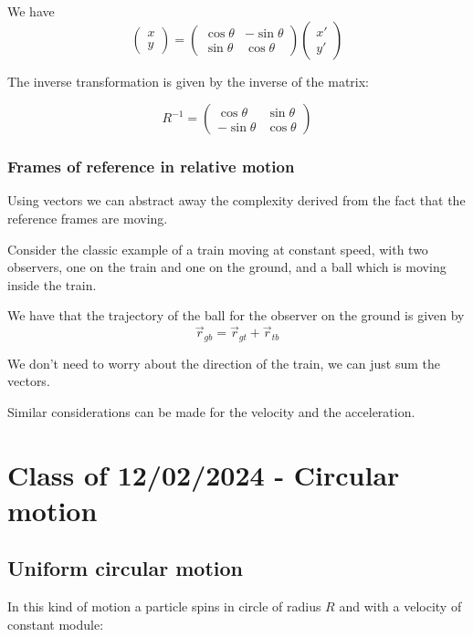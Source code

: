 \documentclass[10pt]{extarticle}
\begin{document}
We have
$$
  \begin{pmatrix}
    x \\
    y
  \end{pmatrix}
  =
  \begin{pmatrix}
    \cos \theta & -\sin \theta \\
    \sin \theta & \cos \theta
  \end{pmatrix}
  \begin{pmatrix}
    x' \\
    y'
  \end{pmatrix}
$$

The inverse transformation is given by the inverse of the matrix:

$$
  R^{-1} = \begin{pmatrix}
    \cos \theta  & \sin \theta \\
    -\sin \theta & \cos \theta
  \end{pmatrix}
$$

\subsubsection{Frames of reference in relative motion}

Using vectors we can abstract away the complexity derived from the fact that the reference frames are moving.

Consider the classic example of a train moving at constant speed, with two observers, one on the train and one on the ground,
and a ball which is moving inside the train.

We have that the trajectory of the ball for the observer on the ground is given by
$$
  \vec{r}_{gb} = \vec{r}_{gt} + \vec{r}_{tb}
$$

We don't need to worry about the direction of the train, we can just sum the vectors.

Similar considerations can be made for the velocity and the acceleration.

\section{Class of 12/02/2024 - Circular motion}

\subsection {Uniform circular motion}

In this kind of motion a particle spins in circle of radius $R$
and with a velocity of constant module:
\end{document}
